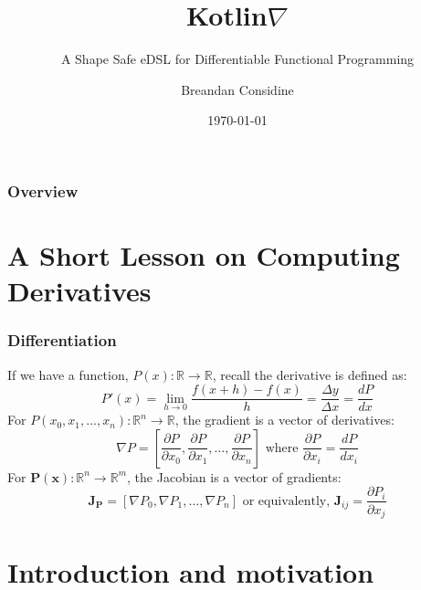 \documentclass{beamer}
\title{Kotlin\texorpdfstring{$\nabla$}{}}
\subtitle{A Shape Safe eDSL for Differentiable Functional Programming}
\author{Breandan Considine}
\institute[UdeM]{
Universit\'e de Montr\'eal \\
\medskip
\textit{breandan.considine@umontreal.ca}
}
\date{\today}
\begin{document}
    \begin{frame}
        \titlepage
    \end{frame}

    \begin{frame}
        \frametitle{Overview}
        \tableofcontents
    \end{frame}

    \section{A Short Lesson on Computing Derivatives}


    \begin{frame}
        \frametitle{Differentiation}
        If we have a function, $P(x): \mathbb{R}\rightarrow\mathbb{R}$, recall the derivative is defined as:
        \begin{equation}
            P'(x) = \lim _{h\to 0}{\frac {f(x+h)-f(x)}{h}} = \frac{\Delta y}{\Delta x} = \frac{dP}{dx}
        \end{equation}
        For $P(x_0, x_1, \dots, x_n): \mathbb{R}^n\rightarrow\mathbb{R}$, the gradient is a vector of derivatives:
        \begin{equation}
            \nabla P = \left[\frac{\partial P}{\partial x_0}, \frac{\partial P}{\partial x_1}, \dots, \dfrac{\partial P}{\partial x_n}\right]\text{ where }\frac{\partial P}{\partial x_i} = \frac{dP}{dx_i}
        \end{equation}
        For $\mathbf{P}(\mathbf{x}): \mathbb{R}^n\rightarrow\mathbb{R}^m$, the Jacobian is a vector of gradients:
        \begin{equation}
            \mathbf{J}_\mathbf{P} = \left[\nabla P_0, \nabla P_1, \dots, \nabla P_n \right] \text{ or equivalently, } \mathbf{J}_{ij} = \frac{\partial P_i}{\partial x_j}
        \end{equation}
    \end{frame}


    \section{Introduction and motivation}
\end{document}
